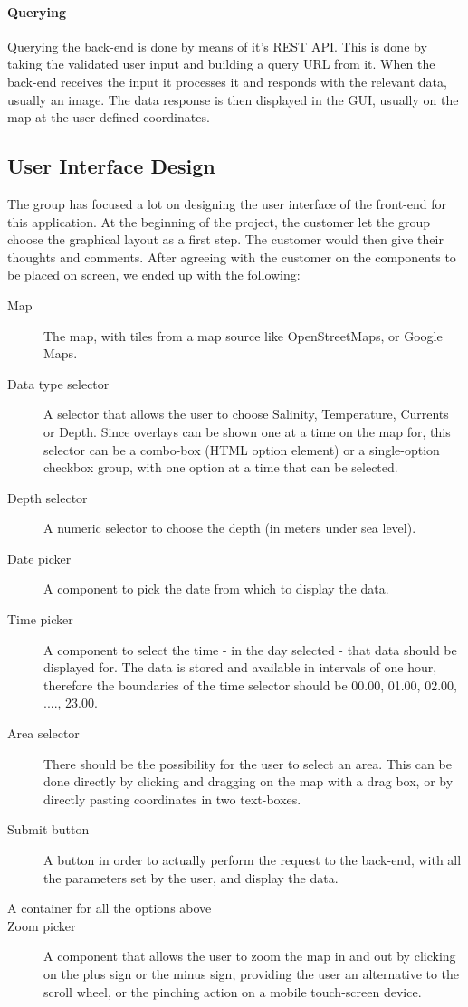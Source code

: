 \documentclass[11pt,a4paper,titlepage,oneside]{report}
\begin{document}
\paragraph{Querying}
Querying the \gls{back-end} is done by means of it's REST \gls{API}. This is done by taking the validated user input and building a query \gls{URL} from it. When the \gls{back-end} receives the input it processes it and responds with the relevant data, usually an image. The data response is then displayed in the \gls{GUI}, usually on the map at the user-defined coordinates. 

\subsection{User Interface Design}
The group has focused a lot on designing the user interface of the front-end for this application.
At the beginning of the project, the customer let the group choose the graphical layout as a first step. The customer would then give their thoughts and comments. After agreeing with the customer on the components to be placed on screen, we ended up with the following:

\begin{description}
\item[Map] The map, with tiles from a map source like OpenStreetMaps, or Google Maps.
\item[Data type selector] A selector that allows the user to choose Salinity, Temperature, Currents or Depth. Since overlays can be shown one at a time on the map for, this selector can be a combo-box (HTML option element) or a single-option checkbox group, with one option at a time that can be selected.
\item[Depth selector] A numeric selector to choose the depth (in meters under sea level).
\item[Date picker] A component to pick the date from which to display the data.
\item[Time picker] A component to select the time - in the day selected - that data should be displayed for. The data is stored and available in intervals of one hour, therefore the boundaries of the time selector should be 00.00, 01.00, 02.00, ...., 23.00.
\item[Area selector] There should be the possibility for the user to select an area. This can be done directly by clicking and dragging on the map with a drag box, or by directly pasting coordinates in two text-boxes.
\item[Submit button] A button in order to actually perform the request to the \gls{back-end}, with all the parameters set by the user, and display the data.
\item[A container for all the options above]
\item[Zoom picker] A component that allows the user to zoom the map in and out by clicking on the plus sign or the minus sign, providing the user an alternative to the scroll wheel, or the pinching action on a mobile touch-screen device.
\end{description}
\end{document}
